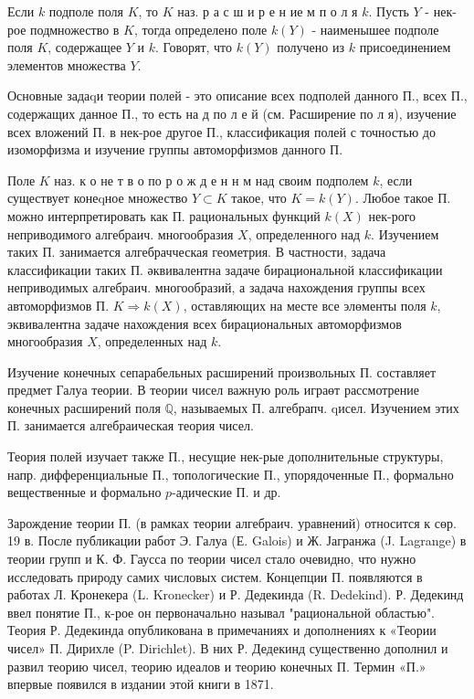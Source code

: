 \documentclass[10pt]{article}
\begin{document}
Если $k$ подполе поля $K$, то $K$ наз. р а с ш и р е н ие м п о л я $k$. Пусть $Y$ - нек-рое подмножество в $K$, тогда определено поле $k(Y)$ - наименышее подполе поля $K$, содержащее $Y$ и $k$. Говорят, что $k(Y)$ получено из $k$ присоединением элементов множества $Y$.



Основные задаqи теории полей - это описание всех подполей данного П., всех П., содержащих данное П., то есть на д по л е й (см. Расширение по л я), изучение всех вложений П. в нек-рое другое П., классификация полей с точностью до изоморфизма и изучение группы автоморфизмов данного П.



Поле $K$ наз. к о не т в о по р о ж д е н н м над своим подполем $k$, если существует конеqное множество $Y \subset K$ такое, что $K=k(Y)$. Любое такое П. можно интерпретировать как П. рациональных функций $k(X)$ нек-рого неприводимого алгебраич. многообразия $X$, определенного над $k$. Изучением таких П. занимается алгебрачческая геометрия. В частности, задача классификации таких П. әквивалентна задаче бирациональной классификации неприводимых алгебраич. многообразий, а задача нахождения группы всех автоморфизмов П. $K \Rightarrow k(X)$, оставляющих на месте все элөменты поля $k$, эквивалентна задаче нахождения всех бирациональных автоморфизмов многообразия $X$, определенных над $k$.



Изучение конечных сепарабельных расширений произвольных П. составляет предмет Галуа теории. В теории чисел важную роль играөт рассмотрение конечных расширений поля $\mathbb{Q}$, называемых П. алгебрапч. qисел. Изучением этих П. занимается алгебраическая теория чисел.



Теория полей изучает также П., несущие нек-рые дополнительные структуры, напр. дифференциальные П., топологические П., упорядоченные П., формально вещественные и формально $p$-адические П. и др.



Зарождение теории П. (в рамках теории алгебраич. уравнений) относится к сөр. 19 в. После публикации работ Э. Галуа (Е. Galois) и Ж. Јагранжа (J. Lagrange) в теории групп и К. Ф. Гаусса по теории чисел стало очевидно, что нужно исследовать природу самих числовых систем. Концепции П. появляются в работах Л. Кронекера (L. Kronecker) и Р. Дедекинда (R. Dedekind). Р. Дедекинд ввел понятие П., к-рое он первоначально называл "рациональной областью". Теория Р. Дедекинда опубликована в примечаниях и дополнениях к «Теории чисел» П. Дирихле (P. Dirichlet). В них Р. Дедекинд существенно дополнил и развил теорию чисел, теорию идеалов и теорию конечных П. Термин «П.» впервые появился в издании этой книги в 1871.
\end{document}

